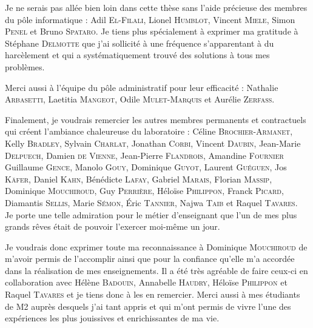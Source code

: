 Je ne serais pas allée bien loin dans cette thèse sans l'aide précieuse des membres du pôle informatique : 
Adil \textsc{El-Filali},
Lionel \textsc{Humblot},
Vincent \textsc{Miele},
Simon \textsc{Penel} et
Bruno \textsc{Spataro}.
Je tiens plus spécialement à exprimer ma gratitude à Stéphane \textsc{Delmotte} que j'ai sollicité à une fréquence s'apparentant à du harcèlement et qui a systématiquement trouvé des solutions à tous mes problèmes.

Merci aussi à l'équipe du pôle administratif pour leur efficacité : 
Nathalie \textsc{Arbasetti},
Laetitia \textsc{Mangeot},
Odile \textsc{Mulet-Marquis} et
Aurélie \textsc{Zerfass}.

Finalement, je voudrais remercier les autres membres permanents et contractuels qui créent l'ambiance chaleureuse du laboratoire : 
Céline \textsc{Brochier-Armanet},
Kelly \textsc{Bradley},
Sylvain \textsc{Charlat},
Jonathan \textsc{Corbi},
Vincent \textsc{Daubin},
Jean-Marie \textsc{Delpuech},
Damien \textsc{de Vienne},
Jean-Pierre \textsc{Flandrois},
Amandine \textsc{Fournier}
Guillaume \textsc{Gence},
Manolo \textsc{Gouy},
Dominique \textsc{Guyot},
Laurent \textsc{Guéguen},
Jos \textsc{Käfer},
Daniel \textsc{Kahn},
Bénédicte \textsc{Lafay},
Gabriel \textsc{Marais},
Florian \textsc{Massip},
Dominique \textsc{Mouchiroud},
Guy \textsc{Perrière},
Héloïse \textsc{Philippon},
Franck \textsc{Picard},
Diamantis \textsc{Sellis},
Marie \textsc{Sémon},
\'Eric \textsc{Tannier},
Najwa \textsc{Taib} et
Raquel \textsc{Tavares}.\\




%




Je porte une telle admiration pour le métier d'enseignant que l'un de mes plus grands rêves était de pouvoir l'exercer moi-même un jour.

Je voudrais donc exprimer toute ma reconnaissance à Dominique \textsc{Mouchiroud} de m'avoir permis de l'accomplir ainsi que pour la confiance qu'elle m'a accordée dans la réalisation de mes enseignements.
Il a été très agréable de faire ceux-ci en collaboration avec Hélène \textsc{Badouin}, Annabelle \textsc{Haudry}, Héloïse \textsc{Philippon} et Raquel \textsc{Tavares} et je tiens donc à les en remercier.
Merci aussi à mes étudiants de M2 auprès desquels j'ai tant appris et qui m'ont permis de vivre l'une des expériences les plus jouissives et enrichissantes de ma vie.

